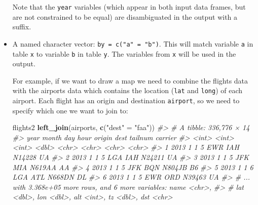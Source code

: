 \documentclass[]{book}
\newenvironment{Shaded}{\begin{snugshade}}{\end{snugshade}}
\newcommand{\KeywordTok}[1]{\textcolor[rgb]{0.13,0.29,0.53}{\textbf{{#1}}}}
\newcommand{\DataTypeTok}[1]{\textcolor[rgb]{0.13,0.29,0.53}{{#1}}}
\newcommand{\StringTok}[1]{\textcolor[rgb]{0.31,0.60,0.02}{{#1}}}
\newcommand{\CommentTok}[1]{\textcolor[rgb]{0.56,0.35,0.01}{\textit{{#1}}}}
\newcommand{\NormalTok}[1]{{#1}}
\begin{document}
\begin{itemize}
\begin{Shaded}
\end{Shaded}

  Note that the \texttt{year} variables (which appear in both input data
  frames, but are not constrained to be equal) are disambiguated in the
  output with a suffix.
\item
  A named character vector: \texttt{by\ =\ c("a"\ =\ "b")}. This will
  match variable \texttt{a} in table \texttt{x} to variable \texttt{b}
  in table \texttt{y}. The variables from \texttt{x} will be used in the
  output.

  For example, if we want to draw a map we need to combine the flights
  data with the airports data which contains the location (\texttt{lat}
  and \texttt{long}) of each airport. Each flight has an origin and
  destination \texttt{airport}, so we need to specify which one we want
  to join to:

\begin{Shaded}
\begin{Highlighting}[]
\NormalTok{flights2 %>%}\StringTok{ }
\StringTok{  }\KeywordTok{left_join}\NormalTok{(airports, }\KeywordTok{c}\NormalTok{(}\StringTok{"dest"} \NormalTok{=}\StringTok{ "faa"}\NormalTok{))}
\CommentTok{#> # A tibble: 336,776 × 14}
\CommentTok{#>    year month   day  hour origin  dest tailnum carrier}
\CommentTok{#>   <int> <int> <int> <dbl>  <chr> <chr>   <chr>   <chr>}
\CommentTok{#> 1  2013     1     1     5    EWR   IAH  N14228      UA}
\CommentTok{#> 2  2013     1     1     5    LGA   IAH  N24211      UA}
\CommentTok{#> 3  2013     1     1     5    JFK   MIA  N619AA      AA}
\CommentTok{#> 4  2013     1     1     5    JFK   BQN  N804JB      B6}
\CommentTok{#> 5  2013     1     1     6    LGA   ATL  N668DN      DL}
\CommentTok{#> 6  2013     1     1     5    EWR   ORD  N39463      UA}
\CommentTok{#> # ... with 3.368e+05 more rows, and 6 more variables: name <chr>,}
\CommentTok{#> #   lat <dbl>, lon <dbl>, alt <int>, tz <dbl>, dst <chr>}

}
\end{Highlighting}
\end{Shaded}
\end{itemize}
\end{document}
